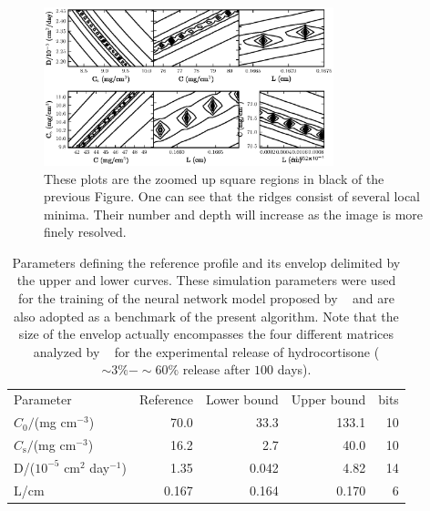 \documentclass[superbib,unsortedaddress,preprint,byrevtex,aps,noshowpacs,titlepage]{revtex4}
\def\Co{C_0}
\def\Cs{C_\text{s}}
\begin{document}
\begin{figure}
  \centering
  \includegraphics[width=0.75\textwidth]{figures/higuchi_proj_zoom.eps}
  \caption{These plots are the zoomed up square regions in black of the previous 
    Figure. One can see that the ridges consist of several
    local minima. Their number and depth will increase as the image is more finely 
    resolved.
  }
  \label{fig:higuchi_zoom}
\end{figure}
\clearpage
\begin{table}
  \caption{Parameters defining the reference profile and its envelop
    delimited by the upper and lower curves.
    These simulation parameters were used for the training of the neural network model
    proposed by ~\cite{Reis2004} and are also adopted as a benchmark of the present algorithm.
    Note that the size of the envelop actually encompasses the four different matrices 
    analyzed by ~\textcite{Fu1976} for the experimental release of hydrocortisone 
    ($\sim 3\% - \sim 60\%$ release after $100$ days).
  }
  \label{tab:ranges}
  \begin{ruledtabular}
    \begin{tabular}{lrrrr}
      Parameter & Reference & Lower bound & Upper bound & bits \\
      \noalign{\smallskip}
      \hline
      $\Co/$(mg cm$^{-3}$)             & 70.0 & 33.3 & 133.1 & 10 \\
      $\Cs/$(mg cm$^{-3}$)             & 16.2 &  2.7 &  40.0 & 10 \\
      D/($10^{-5}$ cm$^2$ day$^{-1}$)   & 1.35 & 0.042 & 4.82 & 14 \\
      L/cm                            & 0.167 & 0.164 & 0.170 & 6 \\
    \end{tabular}
  \end{ruledtabular}
\end{table}
\clearpage
\end{document}
